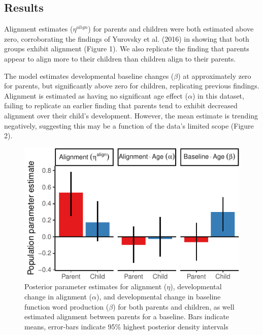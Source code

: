 \documentclass[10pt, letterpaper]{article}
\newenvironment{CodeChunk}{}{}
\begin{document}
\hypertarget{results}{%
\subsection{Results}\label{results}}

Alignment estimates (\(\eta^{align}\)) for parents and children were
both estimated above zero, corroborating the findings of Yurovsky et al.
(2016) in showing that both groups exhibit alignment (Figure 1). We also
replicate the finding that parents appear to align more to their
children than children align to their parents.

The model estimates developmental baseline changes (\(\beta\)) at
approximately zero for parents, but significantly above zero for
children, replicating previous findings. Alignment is estimated as
having no significant age effect (\(\alpha\)) in this dataset, failing
to replicate an earlier finding that parents tend to exhibit decreased
alignment over their child's development. However, the mean estimate is
trending negatively, suggesting this may be a function of the data's
limited scope (Figure 2).

\begin{CodeChunk}
\begin{figure}[tb]
\includegraphics{figs/parameters_plot-1} \caption[Posterior parameter estimates for alignment ($\eta$), developmental change in alignment ($\alpha$), and developmental change in baseline function word production ($\beta$) for both parents and children, as well estimated alignment between parents for a baseline]{Posterior parameter estimates for alignment ($\eta$), developmental change in alignment ($\alpha$), and developmental change in baseline function word production ($\beta$) for both parents and children, as well estimated alignment between parents for a baseline. Bars indicate means, error-bars indicate 95\% highest posterior density intervals}\label{fig:parameters_plot}
\end{figure}
\end{CodeChunk}
\end{document}
